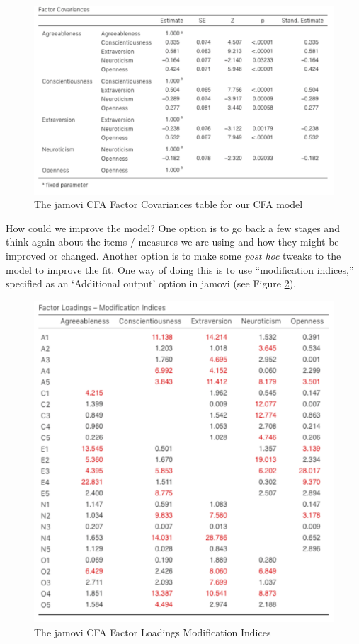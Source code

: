 \documentclass[
]{book}
\begin{document}
\begin{figure}

{\centering \includegraphics[width=1\linewidth]{img/factoranalysis/cfa5} 

}

\caption{The jamovi CFA Factor Covariances table for our CFA model}\label{fig:cfa5}
\end{figure}

How could we improve the model? One option is to go back a few stages and think again about the items / measures we are using and how they might be improved or changed. Another option is to make some \emph{post hoc} tweaks to the model to improve the fit. One way of doing this is to use ``modification indices,'' specified as an `Additional output' option in jamovi (see Figure \ref{fig:cfa6}).

\begin{figure}

{\centering \includegraphics[width=1\linewidth]{img/factoranalysis/cfa6} 

}

\caption{The jamovi CFA Factor Loadings Modification Indices}\label{fig:cfa6}
\end{figure}
\end{document}
